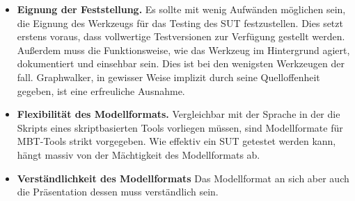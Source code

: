 \begin{itemize} 
\item\textbf{Eignung der Feststellung.} Es sollte mit wenig Aufwänden möglichen sein, die Eignung des Werkzeugs für das Testing des SUT festzustellen. Dies setzt erstens voraus, dass vollwertige Testversionen zur Verfügung gestellt werden. Außerdem muss die Funktionsweise, wie das Werkzeug im Hintergrund agiert, dokumentiert und einsehbar sein. Dies ist bei den wenigsten Werkzeugen der fall. Graphwalker, in gewisser Weise implizit durch seine Quelloffenheit gegeben, ist eine erfreuliche Ausnahme.
\item \textbf{Flexibilität des Modellformats.} Vergleichbar mit der Sprache in der die Skripts eines skriptbasierten Tools vorliegen müssen, sind Modellformate für MBT-Tools strikt vorgegeben. Wie effektiv ein SUT getestet werden kann, hängt massiv von der Mächtigkeit des Modellformats ab.
\item \textbf{Verständlichkeit des Modellformats} Das Modellformat an sich aber auch die Präsentation dessen muss verständlich sein.
\end{itemize}


